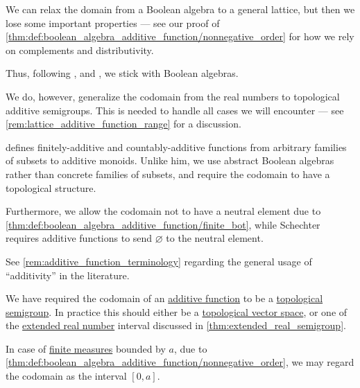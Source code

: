 \begin{comments}
  \item We can relax the domain from a Boolean algebra to a general lattice, but then we lose some important properties --- see our proof of \cref{thm:def:boolean_algebra_additive_function/nonnegative_order} for how we rely on complements and distributivity.

  Thus, following
  ,
   and
  ,
  we stick with Boolean algebras.

  We do, however, generalize the codomain from the real numbers to topological additive semigroups. This is needed to handle all cases we will encounter --- see \cref{rem:lattice_additive_function_range} for a discussion.

  \item {} defines finitely-additive and countably-additive functions from arbitrary families of subsets to additive monoids. Unlike him, we use abstract Boolean algebras rather than concrete families of subsets, and require the codomain to have a topological structure.

  Furthermore, we allow the codomain not to have a neutral element due to \cref{thm:def:boolean_algebra_additive_function/finite_bot}, while Schechter requires additive functions to send \( \varnothing \) to the neutral element.

  \item See \cref{rem:additive_function_terminology} regarding the general usage of \enquote{additivity} in the literature.
\end{comments}

\begin{remark}\label{rem:lattice_additive_function_range}
  We have required the codomain of an \hyperref[def:boolean_algebra_additive_function]{additive function} to be a \hyperref[rem:topological_first_order_structures]{topological} \hyperref[con:additive_semigroup]{semigroup}. In practice this should either be a \hyperref[def:topological_vector_space]{topological vector space}, or one of the \hyperref[def:extended_real_numbers]{extended real number} interval discussed in \cref{thm:extended_real_semigroup}.

  In case of \hyperref[def:finite_measure]{finite measures} bounded by \( a \), due to \cref{thm:def:boolean_algebra_additive_function/nonnegative_order}, we may regard the codomain as the interval \( [0, a] \).
\end{remark}

